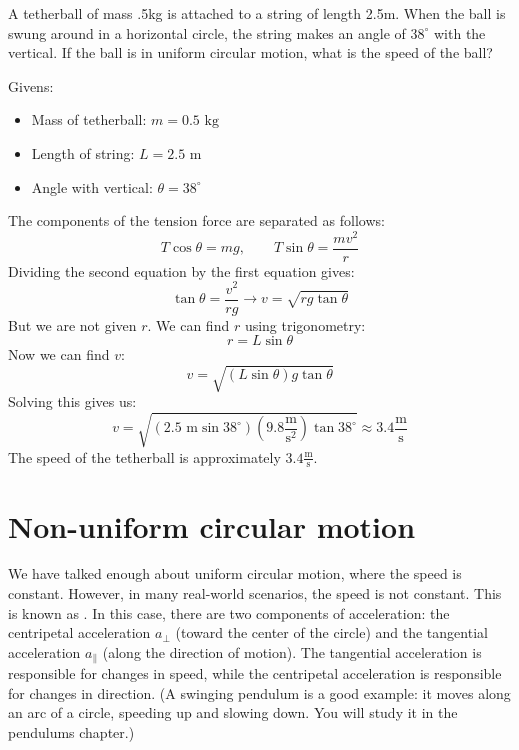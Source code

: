 \begin{Exercise}[label={ex:tetherball}, title={Playground Tetherball}]

  A tetherball of mass .5kg is attached to a string of length 2.5m. When the ball is swung around in a horizontal circle, the string makes an angle of $38^\circ$ with the vertical. If the ball is in uniform circular motion, what is the speed of the ball?
\end{Exercise}
\begin{Answer}[ref={ex:tetherball}]
  Givens:
  \begin{itemize}
    \item Mass of tetherball: $m = 0.5 \text{ kg}$
    \item Length of string: $L = 2.5 \text{ m}$
    \item Angle with vertical: $\theta = 38^\circ$
  \end{itemize}

  The components of the tension force are separated as follows:
  \[
    T\cos\theta = mg,\qquad T\sin\theta = \frac{mv^2}{r}
  \]
  Dividing the second equation by the first equation gives:
  \[
    \tan\theta = \frac{v^2}{rg} \to v = \sqrt{rg\tan\theta}
  \]
  But we are not given $r$. We can find $r$ using trigonometry:
  \[
    r = L\sin\theta
  \]
  Now we can find $v$:
  \[
    v = \sqrt{(L\sin\theta)g\tan\theta}
  \]
  Solving this gives us:
  \[
    v = \sqrt{(2.5\text{ m}\sin 38^\circ)(9.8 \frac{\text{m}}{\text{s}^2})\tan 38^\circ} \approx 3.4 \frac{\text{m}}{\text{s}}
  \]
  The speed of the tetherball is approximately $3.4 \frac{\text{m}}{\text{s}}$.
\end{Answer}

\section{Non-uniform circular motion}
We have talked enough about uniform circular motion, where the speed is constant. However, in many real-world scenarios, the speed is not constant. This is known as . In this case, there are two components of acceleration: the centripetal acceleration $a_\perp$ (toward the center of the circle) and the tangential acceleration $a_\parallel$ (along the direction of motion). The tangential acceleration is responsible for changes in speed, while the centripetal acceleration is responsible for changes in direction. (A swinging pendulum is a good example: it moves along an arc of a
circle, speeding up and slowing down. You will study it in the pendulums
chapter.)

